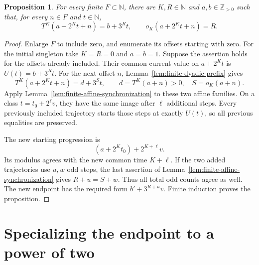 \documentclass[11pt,a4paper]{article}
\newtheorem{proposition}[theorem]{Proposition}
\begin{document}
\begin{proposition}\label{prop:finite-pattern-coalescence}
For every finite $F\subset\mathbb N$, there are $K,R\in\mathbb N$
and $a,b\in\mathbb Z_{>0}$ such that, for every $n\in F$ and $t\in\mathbb N$,
\begin{equation}\label{eq:finite-pattern-coalescence}
T^K(a+2^Kt+n)=b+3^Rt,\qquad
o_K(a+2^Kt+n)=R.
\end{equation}
\end{proposition}
\begin{proof}
Enlarge $F$ to include zero, and enumerate its offsets starting with
zero. For the initial singleton take $K=R=0$ and $a=b=1$.
Suppose the assertion holds for the offsets already included.
Their common current value on $a+2^Kt$ is $U(t)=b+3^Rt$.
For the next offset $n$, Lemma~\ref{lem:finite-dyadic-prefix}
gives
\[
T^K(a+2^Kt+n)=d+3^St,
\qquad d=T^K(a+n)>0,\quad S=o_K(a+n).
\]
Apply Lemma~\ref{lem:finite-affine-synchronization} to these two
affine families. On a class $t=t_0+2^\ell v$, they have the
same image after $\ell$ additional steps. Every previously included
trajectory starts those steps at exactly $U(t)$, so all previous
equalities are preserved.

The new starting progression is
\[
(a+2^Kt_0)+2^{K+\ell}v.
\]
Its modulus agrees with the new common time $K+\ell$.
If the two added trajectories use $u,w$ odd steps, the last
assertion of Lemma~\ref{lem:finite-affine-synchronization} gives
$R+u=S+w$. Thus all total odd counts agree as well.
The new endpoint has the required form $b'+3^{R+u}v$.
Finite induction proves the proposition.
\end{proof}

\section{Specializing the endpoint to a power of two}
\end{document}
